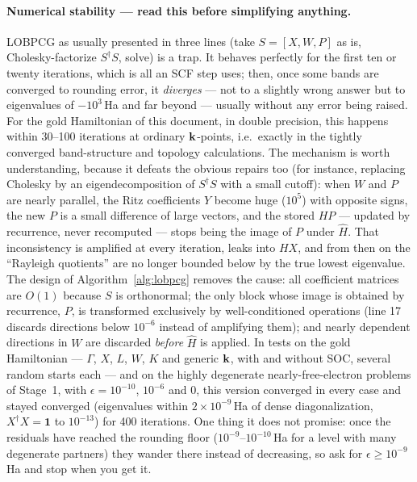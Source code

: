 \paragraph{Numerical stability --- read this before simplifying anything.}
LOBPCG as usually presented in three lines (take $S = [X, W, P]$ as is,
Cholesky-factorize $S^\dagger S$, solve) is a trap. It behaves perfectly
for the first ten or twenty iterations, which is all an SCF step uses; then,
once some bands are converged to rounding error, it \emph{diverges} --- not
to a slightly wrong answer but to eigenvalues of $-10^{3}$\,Ha and far
beyond --- usually without any error being raised. For the gold
Hamiltonian of this document, in double precision, this happens within
30--100 iterations at ordinary $\mathbf{k}$-points, i.e.\ exactly in the tightly
converged band-structure and topology calculations. The mechanism is worth
understanding, because it defeats the obvious repairs too (for instance,
replacing Cholesky by an eigendecomposition of $S^\dagger S$ with a small
cutoff): when $W$ and $P$ are nearly parallel, the Ritz coefficients $Y$
become huge ($10^5$) with opposite signs, the new $P$ is a small difference
of large vectors, and the stored $HP$ --- updated by recurrence, never
recomputed --- stops being the image of $P$ under $\hat H$. That
inconsistency is amplified at every iteration, leaks into $HX$, and from
then on the ``Rayleigh quotients'' are no longer bounded below by the true
lowest eigenvalue. The design of Algorithm~\ref{alg:lobpcg} removes the
cause: all coefficient matrices are $O(1)$ because $S$ is orthonormal; the
only block whose image is obtained by recurrence, $P$, is transformed
exclusively by well-conditioned operations (line 17 discards directions
below $10^{-6}$ instead of amplifying them); and nearly dependent
directions in $W$ are discarded \emph{before} $\hat H$ is applied. In
tests on the gold Hamiltonian --- $\Gamma$, $X$, $L$, $W$, $K$ and generic
$\mathbf{k}$, with and without SOC, several random starts each --- and on the
highly degenerate nearly-free-electron problems of Stage~1, with
$\epsilon = 10^{-10}$, $10^{-6}$ and $0$, this version converged in every
case and stayed converged (eigenvalues within $2\times10^{-9}$\,Ha of dense
diagonalization, $X^\dagger X = \mathbf 1$ to $10^{-13}$) for 400
iterations. One thing it does not promise: once the residuals have
reached the rounding floor ($10^{-9}$--$10^{-10}$\,Ha for a level with
many degenerate partners) they wander there instead of decreasing, so ask
for $\epsilon \ge 10^{-9}$\,Ha and stop when you get it.

